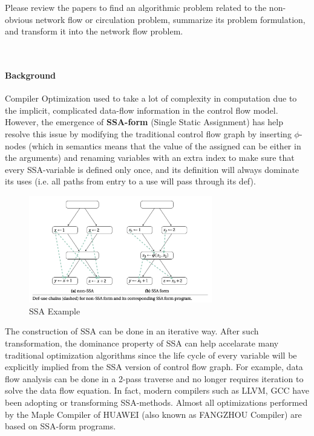 \begin{exercise}[]{Please review the papers to find an algorithmic problem related to the non-obvious network flow or circulation problem, summarize its problem formulation, and transform it into the network flow problem.
    
    }
  \begin{solution}
  \par{~}
  \paragraph{Background} Compiler Optimization used to take a lot of complexity in computation due to the implicit, complicated data-flow information in the control flow model. However, the emergence of \textbf{SSA-form} (Single Static Assignment) has help resolve this issue by modifying the traditional control flow graph by inserting $\phi$-nodes (which in semantics means that the value of the assigned can be either in the arguments) and renaming variables with an extra index to make sure that every SSA-variable is defined only once, and its definition will always dominate its uses (i.e. all paths from entry to a use will pass through its def).

  \begin{figure}
    \centering
    \includegraphics[width=8cm]{img/ex6-ssa.jpg}
    \caption{SSA Example}
    \label{ssa}
  \end{figure}

  The construction of SSA can be done in an iterative way. After such transformation, the dominance property of SSA can help accelarate many traditional optimization algorithms since the life cycle of every variable will be explicitly implied from the SSA version of control flow graph. For example, data flow analysis can be done in a 2-pass traverse and no longer requires iteration to solve the data flow equation. In fact, modern compilers such as LLVM, GCC have been adopting or transforming SSA-methods. Almost all optimizations performed by the Maple Compiler of HUAWEI (also known as FANGZHOU Compiler) are based on SSA-form programs.


\end{solution}
\end{exercise}
